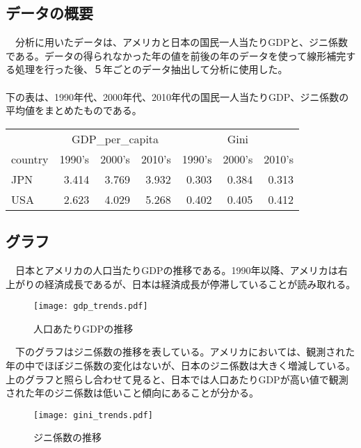 \documentclass{bxjsarticle}
\begin{document}
\subsection{データの概要}
　分析に用いたデータは、アメリカと日本の国民一人当たりGDPと、ジニ係数である。データの得られなかった年の値を前後の年のデータを使って線形補完する処理を行った後、５年ごとのデータ抽出して分析に使用した。\\
\\
 下の表は、1990年代、2000年代、2010年代の国民一人当たりGDP、ジニ係数の平均値をまとめたものである。
\begin{table}[H]
\centering\begingroup\fontsize{15}{17}\selectfont

\begin{tabular}[t]{lrrrrrr}
\toprule
\multicolumn{1}{c}{ } & \multicolumn{3}{c}{GDP\_per\_capita} & \multicolumn{3}{c}{Gini} \\
\cmidrule(l{3pt}r{3pt}){2-4} \cmidrule(l{3pt}r{3pt}){5-7}
country & 1990's & 2000's & 2010's & 1990's & 2000's & 2010's\\
\midrule
JPN & 3.414 & 3.769 & 3.932 & 0.303 & 0.384 & 0.313\\
USA & 2.623 & 4.029 & 5.268 & 0.402 & 0.405 & 0.412\\
\bottomrule
\end{tabular}
\endgroup{}
\end{table}

\subsection{グラフ}
　日本とアメリカの人口当たりGDPの推移である。1990年以降、アメリカは右上がりの経済成長であるが、日本は経済成長が停滞していることが読み取れる。
 
\begin{figure}[H]
\centering
\texttt{[image: gdp\_trends.pdf]}
\caption{人口あたりGDPの推移}
\end{figure}

　下のグラフはジニ係数の推移を表している。アメリカにおいては、観測された年の中でほぼジニ係数の変化はないが、日本のジニ係数は大きく増減している。上のグラフと照らし合わせて見ると、日本では人口あたりGDPが高い値で観測された年のジニ係数は低いこと傾向にあることが分かる。\\
\begin{figure}[H]
\centering
\texttt{[image: gini\_trends.pdf]}
\caption{ジニ係数の推移}
\end{figure}
\end{document}
